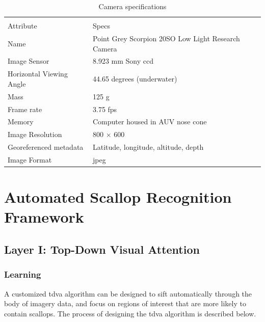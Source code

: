 \documentclass {udthesis}
\begin{document}
%                                                      
\begin{table}                                                     
\centering
\begin{tabularx}{0.6\textwidth}{XX}
\toprule[1pt]\\[-6pt]
Attribute	&Specs\\[2pt]\midrule
Name	&Point Grey Scorpion 20SO Low Light Research Camera\\
Image Sensor	&8.923 mm Sony ccd\\
Horizontal Viewing Angle	&44.65 degrees (underwater)\\
Mass	&125 g\\
Frame rate	&3.75 fps\\
Memory	&Computer housed in AUV nose cone\\
Image Resolution	&800 $\times$ 600\\
Georeferenced metadata	&Latitude, longitude, altitude, depth\\
Image Format	&jpeg\\[2pt]\bottomrule[1pt]
\end{tabularx}
\caption{Camera specifications\label{tab:camera_specs}}
\end{table}


\section{Automated Scallop Recognition Framework}

\subsection{Layer I: Top-Down Visual Attention} \label{subsec:TDVA}

\subsubsection{Learning}

A customized \gls{tdva} algorithm can be designed 
to sift automatically through the body of imagery data, and focus on
regions of interest that are more likely to contain scallops.
The process of designing the \gls{tdva} algorithm is described below.
\end{document}
